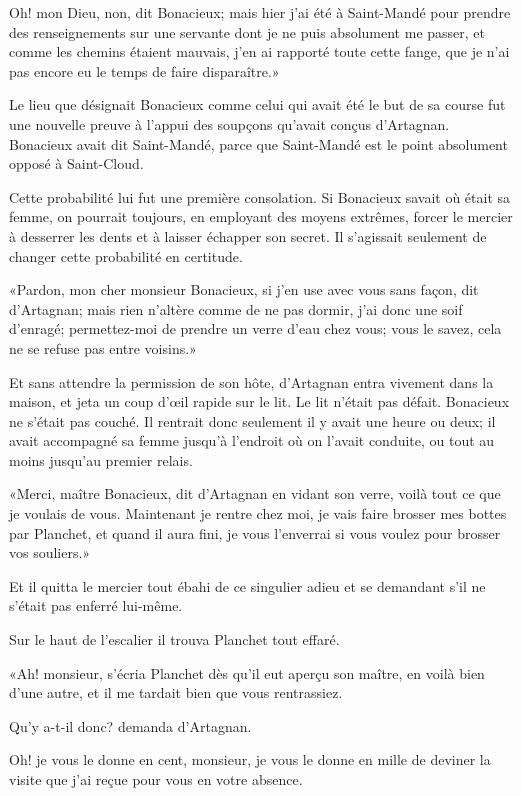 \speak  Oh! mon Dieu, non, dit Bonacieux; mais hier j'ai été à Saint-Mandé pour prendre des renseignements sur une servante dont je ne puis absolument me passer, et comme les chemins étaient mauvais, j'en ai rapporté toute cette fange, que je n'ai pas encore eu le temps de faire disparaître.» 

Le lieu que désignait Bonacieux comme celui qui avait été le but de sa course fut une nouvelle preuve à l'appui des soupçons qu'avait conçus d'Artagnan. Bonacieux avait dit Saint-Mandé, parce que Saint-Mandé est le point absolument opposé à Saint-Cloud. 

Cette probabilité lui fut une première consolation. Si Bonacieux savait où était sa femme, on pourrait toujours, en employant des moyens extrêmes, forcer le mercier à desserrer les dents et à laisser échapper son secret. Il s'agissait seulement de changer cette probabilité en certitude. 

«Pardon, mon cher monsieur Bonacieux, si j'en use avec vous sans façon, dit d'Artagnan; mais rien n'altère comme de ne pas dormir, j'ai donc une soif d'enragé; permettez-moi de prendre un verre d'eau chez vous; vous le savez, cela ne se refuse pas entre voisins.» 

Et sans attendre la permission de son hôte, d'Artagnan entra vivement dans la maison, et jeta un coup d'œil rapide sur le lit. Le lit n'était pas défait. Bonacieux ne s'était pas couché. Il rentrait donc seulement il y avait une heure ou deux; il avait accompagné sa femme jusqu'à l'endroit où on l'avait conduite, ou tout au moins jusqu'au premier relais. 

«Merci, maître Bonacieux, dit d'Artagnan en vidant son verre, voilà tout ce que je voulais de vous. Maintenant je rentre chez moi, je vais faire brosser mes bottes par Planchet, et quand il aura fini, je vous l'enverrai si vous voulez pour brosser vos souliers.» 

Et il quitta le mercier tout ébahi de ce singulier adieu et se demandant s'il ne s'était pas enferré lui-même. 

Sur le haut de l'escalier il trouva Planchet tout effaré. 

«Ah! monsieur, s'écria Planchet dès qu'il eut aperçu son maître, en voilà bien d'une autre, et il me tardait bien que vous rentrassiez. 

\speak  Qu'y a-t-il donc? demanda d'Artagnan. 

\speak  Oh! je vous le donne en cent, monsieur, je vous le donne en mille de deviner la visite que j'ai reçue pour vous en votre absence. 

